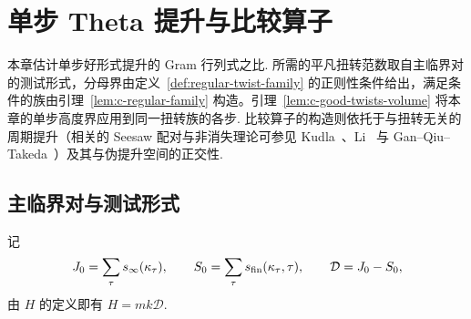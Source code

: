 \chapter{单步 Theta 提升与比较算子}
\label{chap:onelift}

\begin{chapterguide}
本章估计单步好形式提升的 Gram 行列式之比. 所需的平凡扭转范数取自主临界对的测试形式，分母界由定义~\ref{def:regular-twist-family} 的正则性条件给出，满足条件的族由引理~\ref{lem:c-regular-family} 构造。引理~\ref{lem:c-good-twists-volume} 将本章的单步高度界应用到同一扭转族的各步. 比较算子的构造则依托于与扭转无关的周期提升（相关的 Seesaw 配对与非消失理论可参见 Kudla~\cite{Kudla1984}、Li~\cite{Li1992} 与 Gan--Qiu--Takeda~\cite{GQT2014}）及其与伪提升空间的正交性.
\end{chapterguide}

\section{主临界对与测试形式}
\label{sec:c-main-pairs}

记
\[
 J_0=\sum_{\tau}s_\infty(\kappa_\tau),\qquad
 S_0=\sum_{\tau}s_{\rm fin}(\kappa_\tau,\tau),\qquad
 \mathcal D=J_0-S_0 ,
\]
由 $H$ 的定义即有 $H=mk\mathcal D$.

